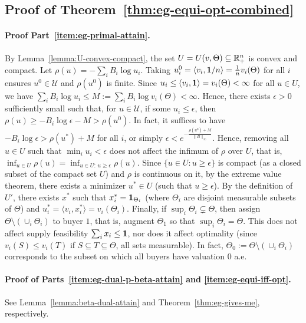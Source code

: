 	\subsection*{Proof of Theorem~\ref{thm:eg-equi-opt-combined}}
	\paragraph{Proof Part~\ref{item:eg-primal-attain}.}
	By Lemma~\ref{lemma:U-convex-compact}, the set $U = U(v, \Theta) \subseteq \mathbb{R}_+^n$ is convex and compact. Let $\rho(u) = -\sum_i B_i \log u_i$. Taking $u^0_i = \langle v_i, \mathbf{1}/n \rangle = \frac{1}{n} v_i(\Theta)$ for all $i$ ensures $u^0\in \mathcal{U}$ and $\rho(u^0)$ is finite. Since
	$u_i \leq \langle v_i, \mathbf{1} \rangle = v_i(\Theta) < \infty$
	for all $u\in U$, we have 
	$\sum_i B_i \log u_i \leq M:= \sum_i B_i \log v_i(\Theta) < \infty$.
	Hence, there exists $\epsilon>0$ sufficiently small such that, for $u\in \mathcal{U}$, if some $u_i \leq \epsilon$, then 
	$\rho(u) \geq - B_i \log \epsilon - M > \rho(u^0)$. 
	In fact, it suffices to have $- B_i \log \epsilon > \rho(u^*) + M$ for all $i$, or simply
	$\epsilon < e^{-\frac{\rho(u^0)+M}{\|B\|_\infty}}$.
	Hence, removing all $u\in U$ such that $\min_i u_i < \epsilon$ does not affect the infimum of $\rho$ over $U$, that is, 
	$\inf_{u \in U} \rho(u) = \inf_{u\in U:\, u\geq \epsilon} \rho(u)$.
	Since $\{ u\in U: u\geq \epsilon \}$ is compact (as a closed subset of the compact set $U$) and $\rho$ is continuous on it, by the extreme value theorem, there exists a minimizer $u^*\in U$ (such that $u\geq \epsilon$). 
	By the definition of $U'$, there exists $x^*$ such that $x^*_i = \mathbf{1}_{\Theta_i}$ (where $\Theta_i$ are disjoint measurable subsets of $\Theta$) and
	 $u^*_i = \langle v_i, x^*_i \rangle = v_i(\Theta_i)$.
	Finally, if $\sup_i \Theta_i \subsetneq \Theta$, then assign $\Theta\setminus (\cup_i \Theta_i)$ to buyer $1$, that is, augment $\Theta_1$ so that $\sup_i \Theta_i = \Theta$. This does not affect supply feasibility $\sum_i x_i \leq \mathbf{1}$, nor does it affect optimality (since $v_i(S) \leq v_i(T)$ if $S\subseteq T \subseteq \Theta$, all sets measurable). In fact, $\Theta_0 := \Theta\setminus (\cup_i \Theta_i)$ corresponds to the subset on which all buyers have valuation $0$ a.e.

	\paragraph{Proof of Parts~\ref{item:eg-dual-p-beta-attain} and \ref{item:eg-equi-iff-opt}.} See Lemma~\ref{lemma:beta-dual-attain} and Theorem~\ref{thm:eg-gives-me}, respectively.

